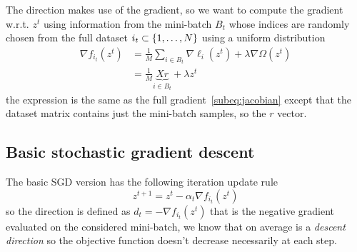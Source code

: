 The direction makes use of the gradient, so we want to compute the gradient w.r.t. $z^t$ using information from the mini-batch $B_t$ whose indices are randomly chosen from the full dataset $i_t\subset\{1,\dots,N\}$ using a uniform distribution%
\begin{equation}\label{eq:mini-grad}
\begin{split}
\nabla f_{i_t}(z^t) &= \frac{1}{M}\sum_{i\in B_t}\nabla \ell_i(z^t)+\lambda\nabla\Omega(z^t) \\
 &= \frac{1}{M}\underbrace{Xr}_{i\in B_t}+\lambda z^t
\end{split}
\end{equation}
the expression is the same as the full gradient~\eqref{subeq:jacobian} except that the dataset matrix contains just the mini-batch samples, so the $r$ vector.




\subsection{Basic stochastic gradient descent}\label{subsc:sgd}

The basic SGD version has the following iteration update rule
\begin{equation}\label{eq:sgd-base}
z^{t+1}=z^t-\alpha_t\nabla f_{i_t}(z^t)
\end{equation}
so the direction is defined as $d_t=-\nabla f_{i_t}(z^t)$ that is the negative gradient evaluated on the considered mini-batch, we know that on average is a \emph{descent direction} so the objective function doesn't decrease necessarily at each step.\pagebreak

